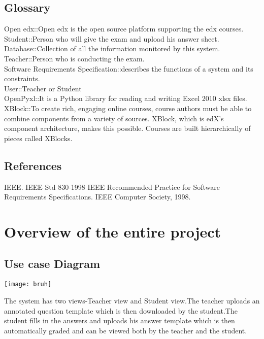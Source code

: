 \documentclass{scrreprt}
\begin{document}
\section{Glossary}
    

    
	    Open edx::Open edx is the open source platform supporting the edx courses. \\        
	    Student::Person who will give the exam and upload his answer sheet. \\        
	    Database::Collection of all the information monitored by this system. \\        
            Teacher::Person who is conducting the exam. \\        
            Software Requirements Specification::describes the functions of a system and its constraints. \\        
            User::Teacher or Student  \\       
            OpenPyxl::It is a Python library for reading and writing Excel 2010 xlsx files.\\
            XBlock::To create rich, engaging online courses, course authors must be able to combine components 
            from a variety of sources. XBlock, which is edX’s component architecture, makes this possible. 
            Courses are built hierarchically of pieces called XBlocks.



\section{References}
IEEE. IEEE Std 830-1998 IEEE Recommended Practice for Software Requirements
Specifications. IEEE Computer Society, 1998.

\chapter{Overview of the entire project}

\section{Use case Diagram}
\texttt{[image: bruh]}


The system has two views-Teacher view and Student view.The teacher uploads an
annotated question template which is then downloaded by the student.The student fills in
the answers and uploads his answer template which is then automatically graded and can
be viewed both by the teacher and the student.
\end{document}
